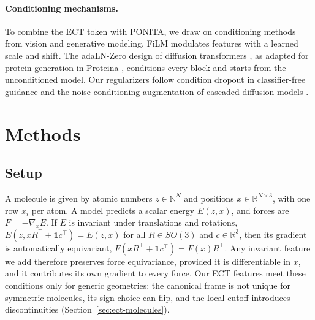\documentclass{article}
\newcommand{\R}{\mathbb{R}}
\newcommand{\N}{\mathbb{N}}
\begin{document}
\paragraph{Conditioning mechanisms.}
To combine the ECT token with PONITA, we draw on conditioning methods from vision and generative modeling. FiLM \citep{perez2018film} modulates features with a learned scale and shift. The adaLN-Zero design of diffusion transformers \citep{peebles2023dit}, as adapted for protein generation in Proteina \citep{geffner2025proteina}, conditions every block and starts from the unconditioned model. Our regularizers follow condition dropout in classifier-free guidance \citep{ho2022cfg} and the noise conditioning augmentation of cascaded diffusion models \citep{ho2022cascaded}.

\section{Methods}

\subsection{Setup}
A molecule is given by atomic numbers $z \in \N^N$ and positions $x \in \R^{N\times 3}$, with one row $x_i$ per atom. A model predicts a scalar energy $E(z,x)$, and forces are $F = -\nabla_x E$. If $E$ is invariant under translations and rotations, $E(z, xR^\top + \mathbf{1}c^\top) = E(z,x)$ for all $R\in SO(3)$ and $c\in\R^3$, then its gradient is automatically equivariant, $F(xR^\top + \mathbf{1}c^\top) = F(x)R^\top$. Any invariant feature we add therefore preserves force equivariance, provided it is differentiable in $x$, and it contributes its own gradient to every force. Our ECT features meet these conditions only for generic geometries: the canonical frame is not unique for symmetric molecules, its sign choice can flip, and the local cutoff introduces discontinuities (Section~\ref{sec:ect-molecules}).
\end{document}
